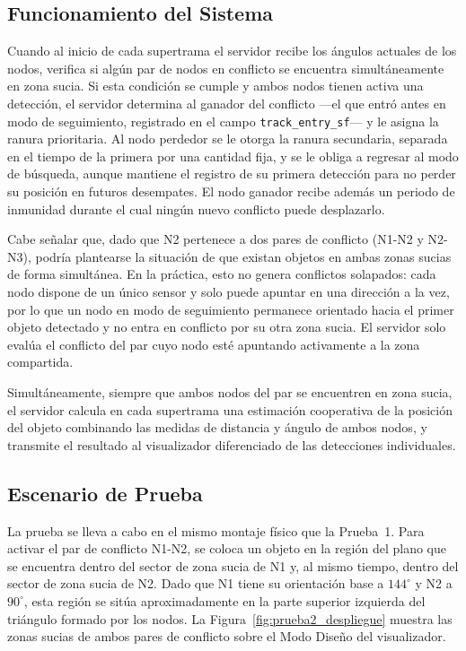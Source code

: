 \subsection{Funcionamiento del Sistema}

Cuando al inicio de cada supertrama el servidor recibe los ángulos actuales de los nodos, verifica si algún par de nodos en conflicto se encuentra simultáneamente en zona sucia. Si esta condición se cumple y ambos nodos tienen activa una detección, el servidor determina al ganador del conflicto ---el que entró antes en modo de seguimiento, registrado en el campo \texttt{track\_entry\_sf}--- y le asigna la ranura prioritaria. Al nodo perdedor se le otorga la ranura secundaria, separada en el tiempo de la primera por una cantidad fija, y se le obliga a regresar al modo de búsqueda, aunque mantiene el registro de su primera detección para no perder su posición en futuros desempates. El nodo ganador recibe además un periodo de inmunidad durante el cual ningún nuevo conflicto puede desplazarlo.

Cabe señalar que, dado que N2 pertenece a dos pares de conflicto (N1-N2 y N2-N3), podría plantearse la situación de que existan objetos en ambas zonas sucias de forma simultánea. En la práctica, esto no genera conflictos solapados: cada nodo dispone de un único sensor y solo puede apuntar en una dirección a la vez, por lo que un nodo en modo de seguimiento permanece orientado hacia el primer objeto detectado y no entra en conflicto por su otra zona sucia. El servidor solo evalúa el conflicto del par cuyo nodo esté apuntando activamente a la zona compartida.

Simultáneamente, siempre que ambos nodos del par se encuentren en zona sucia, el servidor calcula en cada supertrama una estimación cooperativa de la posición del objeto combinando las medidas de distancia y ángulo de ambos nodos, y transmite el resultado al visualizador diferenciado de las detecciones individuales.

\subsection{Escenario de Prueba}

La prueba se lleva a cabo en el mismo montaje físico que la Prueba~1. Para activar el par de conflicto N1-N2, se coloca un objeto en la región del plano que se encuentra dentro del sector de zona sucia de N1 y, al mismo tiempo, dentro del sector de zona sucia de N2. Dado que N1 tiene su orientación base a $144^\circ$ y N2 a $90^\circ$, esta región se sitúa aproximadamente en la parte superior izquierda del triángulo formado por los nodos. La Figura~\ref{fig:prueba2_despliegue} muestra las zonas sucias de ambos pares de conflicto sobre el Modo Diseño del visualizador.

